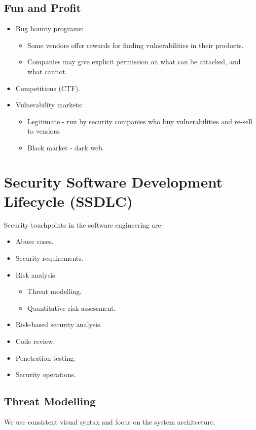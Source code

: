 \documentclass[11pt]{article}
\begin{document}
\subsection{Fun and Profit}
\begin{itemize}
  \item Bug bounty programs:
    \begin{itemize}
      \item Some vendors offer rewards for finding vulnerabilities in their products.
      \item Companies may give explicit permission on what can be attacked, and what cannot.
    \end{itemize}
  \item Competitions (CTF).
  \item Vulnerability markets:
    \begin{itemize}
      \item Legitimate - run by security companies who buy vulnerabilities and re-sell to vendors.
      \item Black market - dark web.
    \end{itemize}
\end{itemize}

\section{Security Software Development Lifecycle (SSDLC)}
Security touchpoints in the software engineering are:
\begin{itemize}
  \item Abuse cases.
  \item Security requirements.
  \item Risk analysis:
    \begin{itemize}
      \item Threat modelling.
      \item Quantitative risk assessment.
    \end{itemize}
  \item Risk-based security analysis.
  \item Code review.
  \item Penetration testing.
  \item Security operations.
\end{itemize}
\subsection{Threat Modelling}
We use consistent visual syntax and focus on the system architecture.
\end{document}
